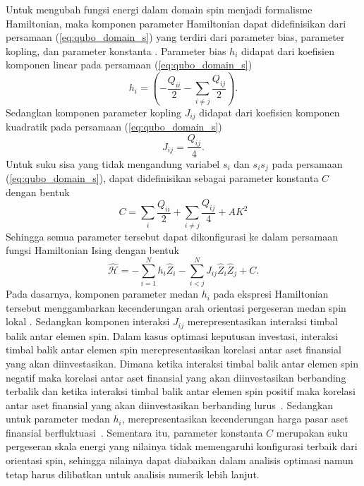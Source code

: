 Untuk mengubah fungsi energi dalam domain spin menjadi formalisme Hamiltonian, maka komponen parameter Hamiltonian dapat didefinisikan dari persamaan (\ref{eq:qubo_domain_s}) yang terdiri dari parameter bias, parameter kopling, dan parameter konstanta \cite{coyle_quantum_2021}. Parameter bias $h_i$ didapat dari koefisien komponen linear pada persamaan (\ref{eq:qubo_domain_s})
\begin{equation}
    h_i = \left(- \frac{Q_{ii}}{2} - \sum_{i\ne j} \frac{Q_{ij}}{2}\right).
\end{equation}
Sedangkan komponen parameter kopling $J_{ij}$ didapat dari koefisien komponen kuadratik pada persamaan (\ref{eq:qubo_domain_s})
\begin{equation}
    J_{ij} = \frac{Q_{ij}}{4}.
\end{equation}
Untuk suku sisa yang tidak mengandung variabel $s_i$ dan $s_is_j$ pada persamaan (\ref{eq:qubo_domain_s}), dapat didefinisikan sebagai parameter konstanta $C$ dengan bentuk
\begin{equation}
    C = \sum_i \frac{Q_{ii}}{2} + \sum_{i\ne j} \frac{Q_{ij}}{4} + AK^2
\end{equation}
Sehingga semua parameter tersebut dapat dikonfigurasi ke dalam persamaan fungsi Hamiltonian Ising dengan bentuk
\begin{equation}
    \hat{\mathcal{H}} = - \sum_{i=1}^N h_i \hat{Z}_i - \sum_{i<j}^N J_{ij} \hat{Z}_i \hat{Z}_j + C.
\end{equation}
Pada dasarnya, komponen parameter medan $h_i$ pada ekspresi Hamiltonian tersebut menggambarkan kecenderungan arah orientasi pergeseran medan spin lokal \cite{lucas_ising_2014}. Sedangkan komponen interaksi $J_{ij}$ merepresentasikan interaksi timbal balik antar elemen spin. Dalam kasus optimasi keputusan investasi, interaksi timbal balik antar elemen spin merepresentasikan korelasi antar aset finansial yang akan diinvestasikan. Dimana ketika interaksi timbal balik antar elemen spin negatif maka korelasi antar aset finansial yang akan diinvestasikan berbanding terbalik dan ketika interaksi timbal balik antar elemen spin positif maka korelasi antar aset finansial yang akan diinvestasikan berbanding lurus~\cite{datta_relationship_2015}. Sedangkan untuk parameter medan $h_i$, merepresentasikan kecenderungan harga pasar aset finansial berfluktuasi~. Sementara itu, parameter konstanta $C$ merupakan suku pergeseran skala energi yang nilainya tidak memengaruhi konfigurasi terbaik dari orientasi spin, sehingga nilainya dapat diabaikan dalam analisis optimasi namun tetap harus dilibatkan untuk analisis numerik lebih lanjut.